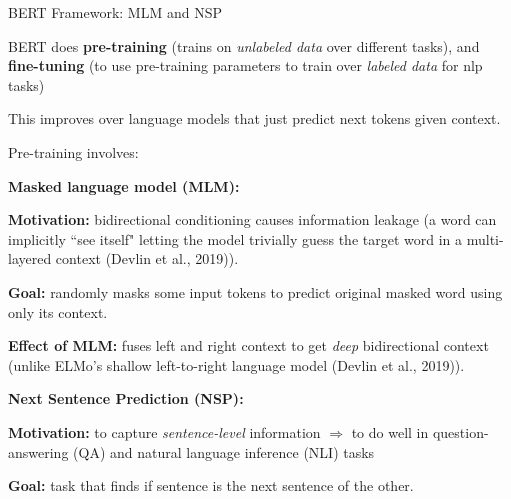 \begin{frame}{BERT Framework: MLM and NSP}

\linespread{0.3} 

BERT does \textbf{pre-training} (trains on \emph{unlabeled data} over different tasks), and \textbf{fine-tuning} (to use pre-training parameters to train over \emph{labeled data} for nlp tasks)

This improves over language models that just predict next tokens given context. 

Pre-training involves:  


{\large \textbf{Masked language model (MLM): }}
    \begin{itemizeSpaced}{5pt}
        \pinkbox \textbf{Motivation: } bidirectional conditioning causes information leakage (a word can implicitly ``see itself" letting the model trivially guess the target word in a multi-layered context (Devlin et al., 2019)). 
        
        \item \textbf{Goal: }randomly masks some input tokens to predict original masked word using only its context. 
        
        \item \textbf{Effect of MLM: } fuses left and right context to get \emph{deep} bidirectional context (unlike ELMo's shallow left-to-right language model (Devlin et al., 2019)).  
    \end{itemizeSpaced}
    
{\large \textbf{Next Sentence Prediction (NSP):}}
    \begin{itemizeSpaced}{5pt}
        \pinkbox \textbf{Motivation: } to capture \emph{sentence-level} information $\Rightarrow$ to do well in question-answering (QA) and natural language inference (NLI) tasks
        
        
        \item \textbf{Goal: } task that finds if sentence is the next sentence of the other. 
        
    \end{itemizeSpaced}
    
\end{frame}


